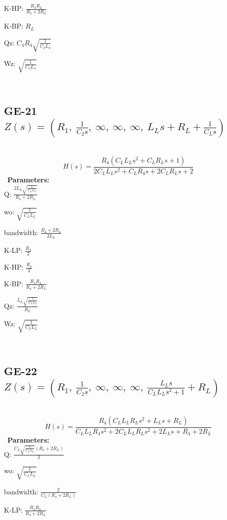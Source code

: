 \documentclass{article}
\begin{document}
K-HP: $\frac{R_{4} R_{L}}{R_{4} + 2 R_{L}}$\ 

K-BP: $R_{L}$\ 

Qz: $C_{4} R_{4} \sqrt{\frac{1}{C_{4} L_{4}}}$\ 

Wz: $\sqrt{\frac{1}{C_{4} L_{4}}}$\ 

\ 

\subsection{GE-21 $Z(s) = \left( R_{1}, \  \frac{1}{C_{2} s}, \  \infty, \  \infty, \  \infty, \  L_{L} s + R_{L} + \frac{1}{C_{L} s}\right)$ } \ 
\textbf{\[H(s) = \frac{R_{4} \left(C_{L} L_{L} s^{2} + C_{L} R_{L} s + 1\right)}{2 C_{L} L_{L} s^{2} + C_{L} R_{4} s + 2 C_{L} R_{L} s + 2}\] } \ 
\textbf{Parameters:}\\ 

Q: $\frac{2 L_{L} \sqrt{\frac{1}{C_{L} L_{L}}}}{R_{4} + 2 R_{L}}$\ 

wo: $\sqrt{\frac{1}{C_{L} L_{L}}}$\ 

bandwidth: $\frac{R_{4} + 2 R_{L}}{2 L_{L}}$\ 

K-LP: $\frac{R_{4}}{2}$\ 

K-HP: $\frac{R_{4}}{2}$\ 

K-BP: $\frac{R_{4} R_{L}}{R_{4} + 2 R_{L}}$\ 

Qz: $\frac{L_{L} \sqrt{\frac{1}{C_{L} L_{L}}}}{R_{L}}$\ 

Wz: $\sqrt{\frac{1}{C_{L} L_{L}}}$\ 

\ 

\subsection{GE-22 $Z(s) = \left( R_{1}, \  \frac{1}{C_{2} s}, \  \infty, \  \infty, \  \infty, \  \frac{L_{L} s}{C_{L} L_{L} s^{2} + 1} + R_{L}\right)$ } \ 
\textbf{\[H(s) = \frac{R_{4} \left(C_{L} L_{L} R_{L} s^{2} + L_{L} s + R_{L}\right)}{C_{L} L_{L} R_{4} s^{2} + 2 C_{L} L_{L} R_{L} s^{2} + 2 L_{L} s + R_{4} + 2 R_{L}}\] } \ 
\textbf{Parameters:}\\ 

Q: $\frac{C_{L} \sqrt{\frac{1}{C_{L} L_{L}}} \left(R_{4} + 2 R_{L}\right)}{2}$\ 

wo: $\sqrt{\frac{1}{C_{L} L_{L}}}$\ 

bandwidth: $\frac{2}{C_{L} \left(R_{4} + 2 R_{L}\right)}$\ 

K-LP: $\frac{R_{4} R_{L}}{R_{4} + 2 R_{L}}$\ 
\end{document}
